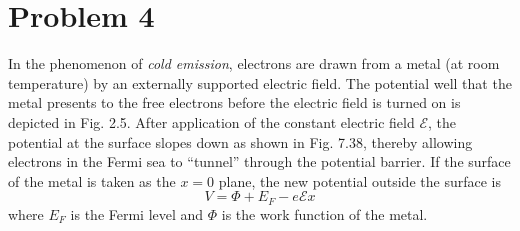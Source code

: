 \documentclass[10pt]{article}
\begin{document}
	\section*{Problem 4}
	In the phenomenon of \textit{cold emission}, electrons are drawn from a metal (at room temperature) by an 
	externally supported electric field. The potential well that the metal presents to the 
	free electrons before the electric field is turned on is depicted in Fig. 2.5. After application of the 
	constant electric field $\mathcal E$, the potential at the surface slopes down as shown in Fig. 7.38, 
	thereby allowing electrons in the Fermi sea to ``tunnel'' through the potential barrier. If the surface of 
	the metal is taken as the $x = 0$ plane, the new potential outside the surface is 
	\[
	V = \Phi + E_F - e\mathcal E x
	\] 
	where $E_F$ is the Fermi level and $\Phi$ is the work function of the metal.
\end{document}
